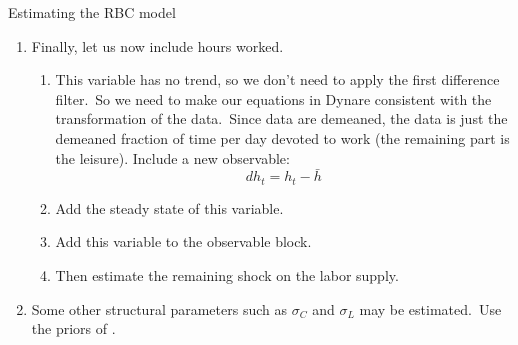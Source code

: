 \documentclass[a4paper,12pt]{article}%
\begin{document}
\begin{myexercise}{Estimating the RBC model}
\begin{enumerate}
\item Finally, let us now include hours worked.\ 

\begin{enumerate}
\item This variable has no trend, so we don't need to apply the first
difference filter.\ So we need to make our equations in Dynare consistent with
the transformation of the data.\ Since data are demeaned, the data is just the
demeaned fraction of time per day devoted to work (the remaining part is the
leisure). Include a new observable:%
\[
dh_{t}=h_{t}-\bar{h}%
\]


\item Add the steady state of this variable.

\item Add this variable to the observable block.

\item Then estimate the remaining shock on the labor supply.
\end{enumerate}

\item Some other structural parameters such as $\sigma_{C}$ and $\sigma_{L}$
may be estimated.\ Use the priors of \cite{smets2007shocks}.
\end{enumerate}

%

\end{myexercise}%
%
\end{document}
